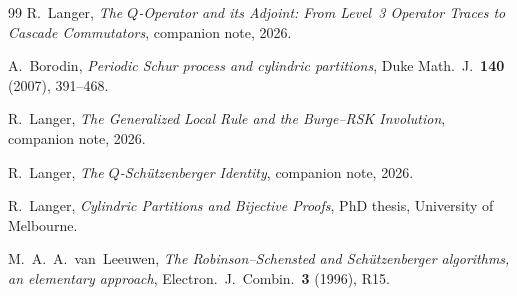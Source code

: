 \documentclass[11pt]{article}
\theoremstyle{plain}
\theoremstyle{definition}
\begin{document}
\begin{thebibliography}{99}
  R.~Langer,
  \emph{The $Q$-Operator and its Adjoint: From Level~3
  Operator Traces to Cascade Commutators},
  companion note, 2026.

  A.~Borodin,
  \emph{Periodic Schur process and cylindric partitions},
  Duke Math.~J.\ \textbf{140} (2007), 391--468.

  R.~Langer,
  \emph{The Generalized Local Rule and the Burge--RSK
  Involution},
  companion note, 2026.

  R.~Langer,
  \emph{The $Q$-Sch\"utzenberger Identity},
  companion note, 2026.

  R.~Langer,
  \emph{Cylindric Partitions and Bijective Proofs},
  PhD thesis, University of Melbourne.

  M.~A.~A.~van~Leeuwen,
  \emph{The Robinson--Schensted and Sch\"utzenberger
  algorithms, an elementary approach},
  Electron.~J.~Combin.\ \textbf{3} (1996), R15.
\end{thebibliography}
\end{document}
